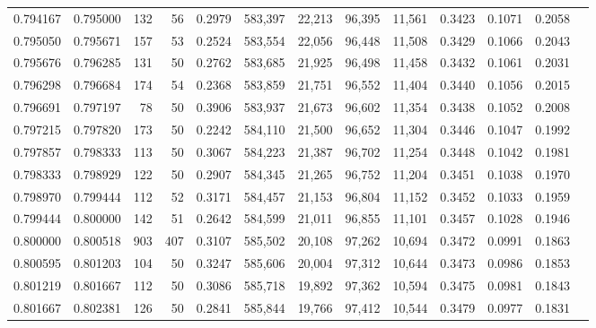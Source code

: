 \begin{tabular}{rrrrrrrrrrrrr}
0.794167 & 0.795000 &    132 &    56 &                                     0.2979 & 583,397 &  22,213 &  96,395 &  11,561 & 0.3423 & 0.1071 & 0.2058 \\
0.795050 & 0.795671 &    157 &    53 &                                     0.2524 & 583,554 &  22,056 &  96,448 &  11,508 & 0.3429 & 0.1066 & 0.2043 \\
0.795676 & 0.796285 &    131 &    50 &                                     0.2762 & 583,685 &  21,925 &  96,498 &  11,458 & 0.3432 & 0.1061 & 0.2031 \\
0.796298 & 0.796684 &    174 &    54 &                                     0.2368 & 583,859 &  21,751 &  96,552 &  11,404 & 0.3440 & 0.1056 & 0.2015 \\
0.796691 & 0.797197 &     78 &    50 &                                     0.3906 & 583,937 &  21,673 &  96,602 &  11,354 & 0.3438 & 0.1052 & 0.2008 \\
0.797215 & 0.797820 &    173 &    50 &                                     0.2242 & 584,110 &  21,500 &  96,652 &  11,304 & 0.3446 & 0.1047 & 0.1992 \\
0.797857 & 0.798333 &    113 &    50 &                                     0.3067 & 584,223 &  21,387 &  96,702 &  11,254 & 0.3448 & 0.1042 & 0.1981 \\
0.798333 & 0.798929 &    122 &    50 &                                     0.2907 & 584,345 &  21,265 &  96,752 &  11,204 & 0.3451 & 0.1038 & 0.1970 \\
0.798970 & 0.799444 &    112 &    52 &                                     0.3171 & 584,457 &  21,153 &  96,804 &  11,152 & 0.3452 & 0.1033 & 0.1959 \\
0.799444 & 0.800000 &    142 &    51 &                                     0.2642 & 584,599 &  21,011 &  96,855 &  11,101 & 0.3457 & 0.1028 & 0.1946 \\
0.800000 & 0.800518 &    903 &   407 &                                     0.3107 & 585,502 &  20,108 &  97,262 &  10,694 & 0.3472 & 0.0991 & 0.1863 \\
0.800595 & 0.801203 &    104 &    50 &                                     0.3247 & 585,606 &  20,004 &  97,312 &  10,644 & 0.3473 & 0.0986 & 0.1853 \\
0.801219 & 0.801667 &    112 &    50 &                                     0.3086 & 585,718 &  19,892 &  97,362 &  10,594 & 0.3475 & 0.0981 & 0.1843 \\
0.801667 & 0.802381 &    126 &    50 &                                     0.2841 & 585,844 &  19,766 &  97,412 &  10,544 & 0.3479 & 0.0977 & 0.1831 \\

\end{tabular}
